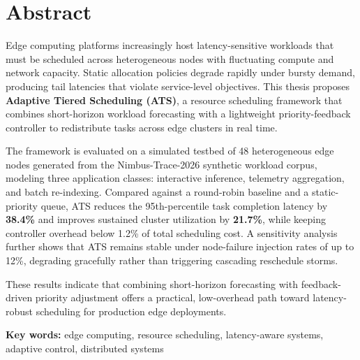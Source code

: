 \chapter*{Abstract}
\seceps

Edge computing platforms increasingly host latency-sensitive workloads that must be
scheduled across heterogeneous nodes with fluctuating compute and network capacity.
Static allocation policies degrade rapidly under bursty demand, producing tail latencies
that violate service-level objectives. This thesis proposes \textbf{Adaptive Tiered
Scheduling (ATS)}, a resource scheduling framework that combines short-horizon workload
forecasting with a lightweight priority-feedback controller to redistribute tasks across
edge clusters in real time.

The framework is evaluated on a simulated testbed of 48 heterogeneous edge nodes
generated from the Nimbus-Trace-2026 synthetic workload corpus, modeling three
application classes: interactive inference, telemetry aggregation, and batch
re-indexing. Compared against a round-robin baseline and a static-priority queue,
ATS reduces the 95th-percentile task completion latency by \textbf{38.4\%} and improves
sustained cluster utilization by \textbf{21.7\%}, while keeping controller overhead below
1.2\% of total scheduling cost. A sensitivity analysis further shows that ATS remains
stable under node-failure injection rates of up to 12\%, degrading gracefully rather
than triggering cascading reschedule storms.

These results indicate that combining short-horizon forecasting with feedback-driven
priority adjustment offers a practical, low-overhead path toward latency-robust
scheduling for production edge deployments.

\vspace{0.6cm}
\noindent\textbf{Key words:} edge computing, resource scheduling, latency-aware systems,
adaptive control, distributed systems

\clearpage

\tableofcontents
\clearpage

\listoffigures
{}
\clearpage

\listoftables
{}
\clearpage

